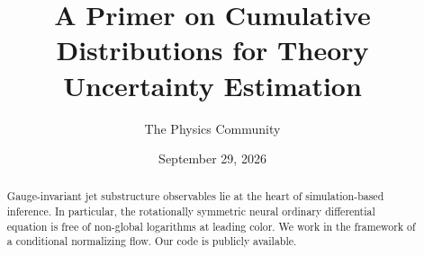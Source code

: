 \documentclass[11pt]{article}
\title{A Primer on Cumulative Distributions for Theory Uncertainty Estimation}
\author{The Physics Community}
\date{September 29, 2026}
\begin{document}
\maketitle
\begin{abstract}
Gauge-invariant jet substructure observables lie at the heart of
simulation-based inference. In particular, the rotationally symmetric
neural ordinary differential equation is free of non-global logarithms
at leading color. We work in the framework of a conditional normalizing
flow. Our code is publicly available.
\end{abstract}
\tableofcontents





\nocite{*}


\end{document}
